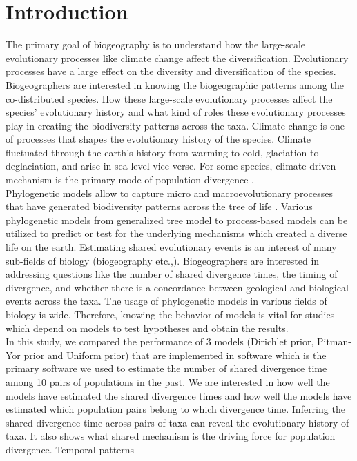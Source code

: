 \documentclass[letterpaper,12pt]{article}
\begin{document}
\section{Introduction}
The primary goal of biogeography is to understand how the large-scale evolutionary processes like climate change affect the diversification. Evolutionary processes have a large effect on the diversity and diversification of the species. Biogeographers are interested in knowing the biogeographic patterns among the co-distributed species. How these large-scale evolutionary processes affect the species' evolutionary history and what kind of roles these evolutionary processes play in creating the biodiversity patterns across the taxa. Climate change is one of processes that shapes the evolutionary history of the species. Climate fluctuated through the earth's history from warming to cold, glaciation to deglaciation, and arise in sea level vice verse. For some species, climate-driven mechanism is the primary mode of population divergence \citep{Oaks2019codemogpreprint}.\\ Phylogenetic models allow to capture micro and macroevolutionary processes that have generated biodiversity patterns across the tree of life \citep{Oaks2022}. Various phylogenetic models from generalized tree model to process-based models can be utilized to predict or test for the underlying mechanisms which created a diverse life on the earth. Estimating shared evolutionary events is an interest of many sub-fields of biology (biogeography etc.,). Biogeographers are interested in addressing questions like the number of shared divergence times, the timing of divergence, and whether there is a concordance between geological and biological events across the taxa. The usage of phylogenetic models in various fields of biology is wide. Therefore, knowing the behavior of models is vital for studies which depend on models to test hypotheses and obtain the results.\\
In this study, we compared the performance of 3 models (Dirichlet prior, Pitman-Yor prior and Uniform prior) 
that are implemented in \ecoevolity software which is the primary software we used to estimate the number of shared divergence time among 10 pairs of populations in the past. We are interested in how well the models have estimated the shared divergence times and how well the models have estimated which population pairs belong to which divergence time. Inferring the shared divergence time across pairs of taxa can reveal the evolutionary history of taxa. It also shows what shared mechanism is the driving force for population divergence. Temporal patterns             
\end{document}
